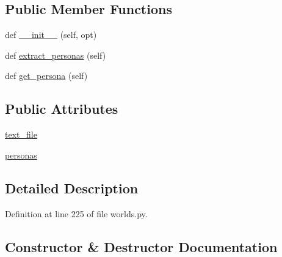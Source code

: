 \subsection*{Public Member Functions}
\begin{DoxyCompactItemize}
\item 
def \hyperlink{classprojects_1_1controllable__dialogue_1_1mturk_1_1worlds_1_1PersonasGenerator_a75f010d08625f01ab710857ffb490372}{\+\_\+\+\_\+init\+\_\+\+\_\+} (self, opt)
\item 
def \hyperlink{classprojects_1_1controllable__dialogue_1_1mturk_1_1worlds_1_1PersonasGenerator_aa850e152f50cbd96ea6899a830bdad10}{extract\+\_\+personas} (self)
\item 
def \hyperlink{classprojects_1_1controllable__dialogue_1_1mturk_1_1worlds_1_1PersonasGenerator_a788311f725f83f4f6da141df5241ca11}{get\+\_\+persona} (self)
\end{DoxyCompactItemize}
\subsection*{Public Attributes}
\begin{DoxyCompactItemize}
\item 
\hyperlink{classprojects_1_1controllable__dialogue_1_1mturk_1_1worlds_1_1PersonasGenerator_af1584a9c62e442bd5991c9332d809b9e}{text\+\_\+file}
\item 
\hyperlink{classprojects_1_1controllable__dialogue_1_1mturk_1_1worlds_1_1PersonasGenerator_a1ac9eda4d2584436eda2d19cccb4c70a}{personas}
\end{DoxyCompactItemize}


\subsection{Detailed Description}


Definition at line 225 of file worlds.\+py.



\subsection{Constructor \& Destructor Documentation}
\mbox{\label{classprojects_1_1controllable__dialogue_1_1mturk_1_1worlds_1_1PersonasGenerator_a75f010d08625f01ab710857ffb490372}} 
